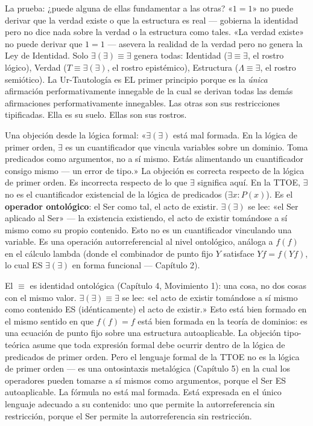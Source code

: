 \documentclass[10pt, openany, oneside]{book}
\begin{document}
La prueba: ¿puede alguna de ellas fundamentar a las otras? «$1 = 1$» no puede derivar que la verdad existe o que la estructura es real --- gobierna la identidad pero no dice nada sobre la verdad o la estructura como tales. «La verdad existe» no puede derivar que $1 = 1$ --- asevera la realidad de la verdad pero no genera la Ley de Identidad. Solo $\exists(\exists) \equiv \exists$ genera todas: Identidad ($\exists \equiv \exists$, el rostro lógico), Verdad ($T \equiv \exists(\exists)$, el rostro epistémico), Estructura ($\Lambda \equiv \exists$, el rostro semiótico). La Ur-Tautología es EL primer principio porque es la \textit{única} afirmación performativamente innegable de la cual se derivan todas las demás afirmaciones performativamente innegables. Las otras son sus restricciones tipificadas. Ella es su suelo. Ellas son sus rostros.

Una objeción desde la lógica formal: «$\exists(\exists)$ está mal formada. En la lógica de primer orden, $\exists$ es un cuantificador que vincula variables sobre un dominio. Toma predicados como argumentos, no a sí mismo. Estás alimentando un cuantificador consigo mismo --- un error de tipo.» La objeción es correcta respecto de la lógica de primer orden. Es incorrecta respecto de lo que $\exists$ significa aquí. En la TTOE, $\exists$ no es el cuantificador existencial de la lógica de predicados ($\exists x: P(x)$). Es el \textbf{operador ontológico}: el Ser como tal, el acto de existir. $\exists(\exists)$ se lee: «el Ser aplicado al Ser» --- la existencia existiendo, el acto de existir tomándose a sí mismo como su propio contenido. Esto no es un cuantificador vinculando una variable. Es una operación autorreferencial al nivel ontológico, análoga a $f(f)$ en el cálculo lambda (donde el combinador de punto fijo $Y$ satisface $Yf = f(Yf)$, lo cual ES $\exists(\exists)$ en forma funcional --- Capítulo 2).

El $\equiv$ es identidad ontológica (Capítulo 4, Movimiento 1): una cosa, no dos cosas con el mismo valor. $\exists(\exists) \equiv \exists$ se lee: «el acto de existir tomándose a sí mismo como contenido ES (idénticamente) el acto de existir.» Esto está bien formado en el mismo sentido en que $f(f) = f$ está bien formada en la teoría de dominios: es una ecuación de punto fijo sobre una estructura autoaplicable. La objeción tipo-teórica asume que toda expresión formal debe ocurrir dentro de la lógica de predicados de primer orden. Pero el lenguaje formal de la TTOE no es la lógica de primer orden --- es una ontosintaxis metalógica (Capítulo 5) en la cual los operadores pueden tomarse a sí mismos como argumentos, porque el Ser ES autoaplicable. La fórmula no está mal formada. Está expresada en el único lenguaje adecuado a su contenido: uno que permite la autorreferencia sin restricción, porque el Ser permite la autorreferencia sin restricción.
\end{document}
